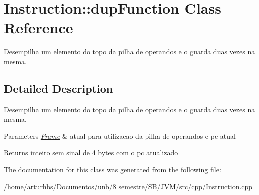 \hypertarget{classInstruction_1_1dupFunction}{}\section{Instruction\+:\+:dup\+Function Class Reference}
\label{classInstruction_1_1dupFunction}


Desempilha um elemento do topo da pilha de operandos e o guarda duas vezes na mesma.  




\subsection{Detailed Description}
Desempilha um elemento do topo da pilha de operandos e o guarda duas vezes na mesma. 


\begin{DoxyParams}{Parameters}
{\em \hyperlink{classFrame}{Frame}} & atual para utilizacao da pilha de operandos e pc atual \\
\hline
\end{DoxyParams}
\begin{DoxyReturn}{Returns}
inteiro sem sinal de 4 bytes com o pc atualizado 
\end{DoxyReturn}


The documentation for this class was generated from the following file\+:\begin{DoxyCompactItemize}
\item 
/home/arturhbs/\+Documentos/unb/8 semestre/\+S\+B/\+J\+V\+M/src/cpp/\hyperlink{Instruction_8cpp}{Instruction.\+cpp}\end{DoxyCompactItemize}
